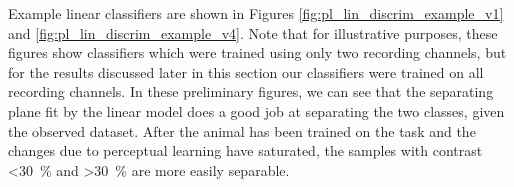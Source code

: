 Example linear classifiers are shown in Figures \ref{fig:pl_lin_discrim_example_v1} and \ref{fig:pl_lin_discrim_example_v4}.
Note that for illustrative purposes, these figures show classifiers which were trained using only two recording channels, but for the results discussed later in this section our classifiers were trained on all recording channels.
In these preliminary figures, we can see that the separating plane fit by the linear model does a good job at separating the two classes, given the observed dataset.
After the animal has been trained on the task and the changes due to perceptual learning have saturated, the samples with contrast \SI{<30}{\percent} and \SI{>30}{\percent} are more easily separable.



